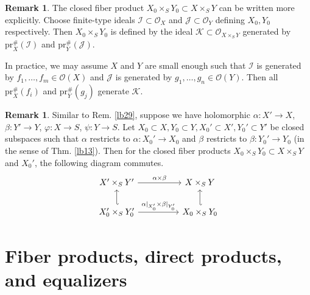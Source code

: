 \documentclass[12pt,b5paper,notitlepage]{report}
\theoremstyle{definition}
\newtheorem{rem}[df]{Remark}
\theoremstyle{plain}
\newcommand{\mc}{\mathcal}
\newcommand{\scr}{\mathscr}
\newcommand{\pr}{\mathrm {pr}}
\numberwithin{equation}{section}
\begin{document}
\begin{rem}\label{lb35}
The closed fiber product $X_0\times_SY_0\subset X\times_SY$ can be written more explicitly. Choose finite-type ideals $\mc I\subset\scr O_X$ and $\mc J\subset\scr O_Y$ defining $X_0,Y_0$ respectively. Then $X_0\times_SY_0$ is defined by the ideal $\mc K\subset \scr O_{X\times_SY}$ generated by $\pr_X^\#(\mc I)$ and $\pr_Y^\#(\mc J)$. 

In practice, we may assume $X$ and $Y$ are small enough such that $\mc I$ is generated by $f_1,\dots,f_m\in\scr O(X)$ and $\mc J$ is generated by $g_1,\dots,g_n\in\scr O(Y)$. Then all $\pr_X^\#(f_i)$ and $\pr_Y^\#(g_j)$ generate $\mc K$.  \hfill\qedsymbol
\end{rem}




\begin{rem}
Similar to Rem. \ref{lb29}, suppose we have holomorphic $\alpha:X'\rightarrow X$, $\beta:Y'\rightarrow Y$, $\varphi:X\rightarrow S$, $\psi:Y\rightarrow S$. Let $X_0\subset X,Y_0\subset Y,X_0'\subset X',Y_0'\subset Y'$ be closed subspaces such that $\alpha$ restricts to $\alpha:X_0'\rightarrow X_0$ and $\beta$ restricts to $\beta:Y_0'\rightarrow Y_0$ (in the sense of Thm. \ref{lb13}). Then for the closed fiber products $X_0\times_S Y_0\subset X\times_SY$ and $X_0'$, the following diagram commutes.
\begin{equation}
\begin{tikzcd}
X'\times_SY' \arrow[rr, "\alpha\times\beta"]                            &  & X\times_SY                 \\
X_0'\times_SY_0' \arrow[rr, "\alpha|_{X_0'}\times\beta|_{Y_0'}"] \arrow[u, hook']& & X_0\times_S Y_0 \arrow[u, hook']
\end{tikzcd}
\end{equation}
\end{rem}




\section{Fiber products, direct products, and equalizers}
\end{document}
